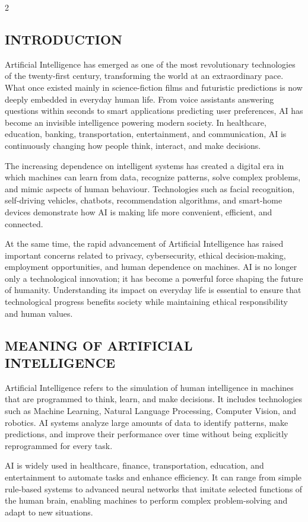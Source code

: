\begin{multicols}{2}
  \subsection*{\centering\uppercase{Introduction}}
  Artificial Intelligence has emerged as one of the most revolutionary technologies of the twenty-first century, transforming the world at an extraordinary pace. What once existed mainly in science-fiction films and futuristic predictions is now deeply embedded in everyday human life. From voice assistants answering questions within seconds to smart applications predicting user preferences, AI has become an invisible intelligence powering modern society. In healthcare, education, banking, transportation, entertainment, and communication, AI is continuously changing how people think, interact, and make decisions.

  \noindent
  The increasing dependence on intelligent systems has created a digital era in which machines can learn from data, recognize patterns, solve complex problems, and mimic aspects of human behaviour. Technologies such as facial recognition, self-driving vehicles, chatbots, recommendation algorithms, and smart-home devices demonstrate how AI is making life more convenient, efficient, and connected.

  \noindent
  At the same time, the rapid advancement of Artificial Intelligence has raised important concerns related to privacy, cybersecurity, ethical decision-making, employment opportunities, and human dependence on machines. AI is no longer only a technological innovation; it has become a powerful force shaping the future of humanity. Understanding its impact on everyday life is essential to ensure that technological progress benefits society while maintaining ethical responsibility and human values.

  \subsection*{\centering\uppercase{Meaning of Artificial Intelligence}}
  Artificial Intelligence refers to the simulation of human intelligence in machines that are programmed to think, learn, and make decisions. It includes technologies such as Machine Learning, Natural Language Processing, Computer Vision, and robotics. AI systems analyze large amounts of data to identify patterns, make predictions, and improve their performance over time without being explicitly reprogrammed for every task.

  \noindent
  AI is widely used in healthcare, finance, transportation, education, and entertainment to automate tasks and enhance efficiency. It can range from simple rule-based systems to advanced neural networks that imitate selected functions of the human brain, enabling machines to perform complex problem-solving and adapt to new situations.


\end{multicols}
